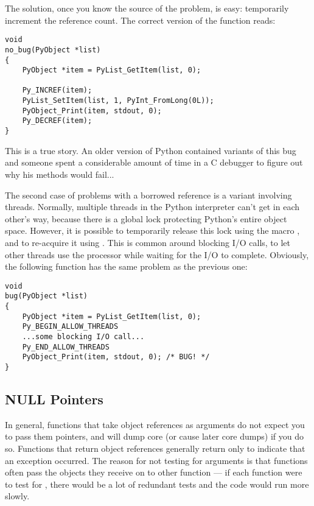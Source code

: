 The solution, once you know the source of the problem, is easy:
temporarily increment the reference count.  The correct version of the
function reads:

\begin{verbatim}
void
no_bug(PyObject *list)
{
    PyObject *item = PyList_GetItem(list, 0);

    Py_INCREF(item);
    PyList_SetItem(list, 1, PyInt_FromLong(0L));
    PyObject_Print(item, stdout, 0);
    Py_DECREF(item);
}
\end{verbatim}

This is a true story.  An older version of Python contained variants
of this bug and someone spent a considerable amount of time in a C
debugger to figure out why his  methods would fail...

The second case of problems with a borrowed reference is a variant
involving threads.  Normally, multiple threads in the Python
interpreter can't get in each other's way, because there is a global
lock protecting Python's entire object space.  However, it is possible
to temporarily release this lock using the macro
, and to re-acquire it using
.  This is common around blocking
I/O calls, to let other threads use the processor while waiting for
the I/O to complete.  Obviously, the following function has the same
problem as the previous one:

\begin{verbatim}
void
bug(PyObject *list)
{
    PyObject *item = PyList_GetItem(list, 0);
    Py_BEGIN_ALLOW_THREADS
    ...some blocking I/O call...
    Py_END_ALLOW_THREADS
    PyObject_Print(item, stdout, 0); /* BUG! */
}
\end{verbatim}


\subsection{NULL Pointers
            \label{nullPointers}}

In general, functions that take object references as arguments do not
expect you to pass them \NULL{} pointers, and will dump core (or
cause later core dumps) if you do so.  Functions that return object
references generally return \NULL{} only to indicate that an
exception occurred.  The reason for not testing for \NULL{}
arguments is that functions often pass the objects they receive on to
other function --- if each function were to test for \NULL,
there would be a lot of redundant tests and the code would run more
slowly.

